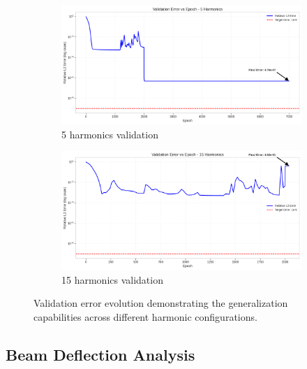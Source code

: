 \begin{figure}[H]
    \centering
    \begin{subfigure}[b]{0.48\textwidth}
        \centering
        \includegraphics[width=\textwidth]{figures/validation_error_5h.png}
        \caption{5 harmonics validation}
    \end{subfigure}
    \hfill
    \begin{subfigure}[b]{0.48\textwidth}
        \centering
        \includegraphics[width=\textwidth]{figures/validation_error_15h.png}
        \caption{15 harmonics validation}
    \end{subfigure}
    \caption{Validation error evolution demonstrating the generalization capabilities across different harmonic configurations.}
    \label{fig:validation_comparison}
\end{figure}

\subsection{Beam Deflection Analysis}

